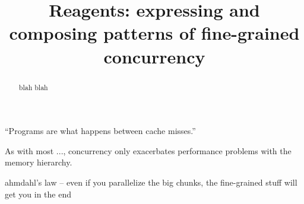 \documentclass[preprint]{sigplanconf}
\begin{document}
\authorinfo{}{}{}
\title{Reagents: expressing and composing patterns of fine-grained concurrency}
\maketitle

\begin{abstract}
blah blah
\end{abstract}

``Programs are what happens between cache misses.''

As with most ..., concurrency only exacerbates performance problems
with the memory hierarchy.

ahmdahl's law -- even if you parallelize the big chunks, the
fine-grained stuff will get you in the end


  



\end{document}
